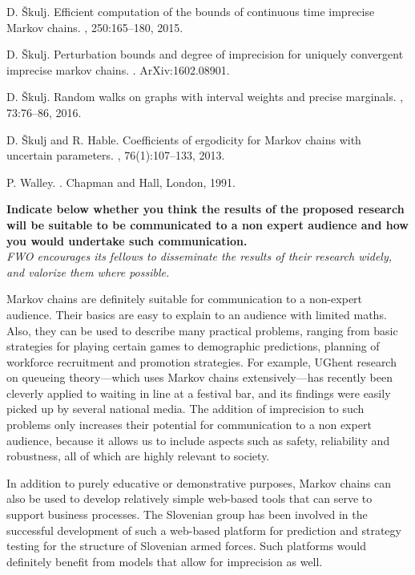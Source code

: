 \documentclass[11pt,dvipsnames,usenames,a4paper]{article}
\begin{document}
\begin{thebibliography}{10}
D. \v{S}kulj.
\newblock Efficient computation of the bounds of continuous time imprecise
  {M}arkov chains.
, 250:165--180, 2015.

D. \v{S}kulj.
\newblock Perturbation bounds and degree of imprecision for uniquely convergent
  imprecise markov chains.
  .
\newblock ArXiv:1602.08901.

D. \v{S}kulj.
\newblock Random walks on graphs with interval weights and precise marginals.
,
  73:76--86, 2016.

D. \v{S}kulj and R. Hable.
\newblock Coefficients of ergodicity for {M}arkov chains with uncertain
  parameters.
, 76(1):107--133, 2013.

P. Walley.
.
\newblock Chapman and Hall, London, 1991.

\end{thebibliography}

\vspace{5mm}

\textbf{Indicate below whether you think the results of the proposed research will be suitable to be communicated to a non expert audience and how you would undertake such communication.}\\
\textit{FWO encourages its fellows to disseminate the results of their research widely, and valorize them where possible.}

Markov chains are definitely suitable for communication to a non-expert audience. 
Their basics are easy to explain to an audience with limited maths. 
Also, they can be used to describe many practical problems, ranging from basic strategies for playing certain games to demographic predictions, planning of workforce recruitment and promotion strategies. 
For example, UGhent research on queueing theory---which uses Markov chains extensively---has recently been cleverly applied to waiting in line at a festival bar, and its findings were easily picked up by several national media.
The addition of imprecision to such problems only increases their potential for communication to a non expert audience, because it allows us to include aspects such as safety, reliability and robustness, all of which are highly relevant to society.

In addition to purely educative or demonstrative purposes, Markov chains can also be used to develop relatively simple web-based tools that can serve to support business processes. 
The Slovenian group has been involved in the successful development of such a web-based platform for prediction and strategy testing for the structure of Slovenian armed forces. 
Such platforms would definitely benefit from models that allow for imprecision as well.
\end{document}
